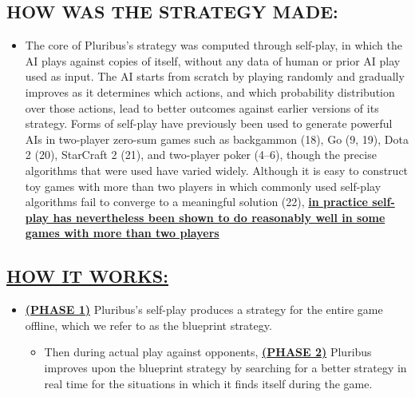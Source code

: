 \documentclass[
]{article}
\begin{document}
\subsection{HOW WAS THE STRATEGY MADE:}\label{how-was-the-strategy-made}

\begin{itemize}
\item
  The core of Pluribus's strategy was computed through self-play, in
  which the AI plays against copies of itself, without any data of human
  or prior AI play used as input. The AI starts from scratch by playing
  randomly and gradually improves as it determines which actions, and
  which probability distribution over those actions, lead to better
  outcomes against earlier versions of its strategy. Forms of self-play
  have previously been used to generate powerful AIs in two-player
  zero-sum games such as backgammon (18), Go (9, 19), Dota 2 (20),
  StarCraft 2 (21), and two-player poker (4--6), though the precise
  algorithms that were used have varied widely. Although it is easy to
  construct toy games with more than two players in which commonly used
  self-play algorithms fail to converge to a meaningful solution (22),
  \textbf{\ul{in practice self-play has nevertheless been shown to do
  reasonably well in some games with more than two players}}
\end{itemize}

\subsection{\texorpdfstring{\textbf{\ul{HOW IT
WORKS:}}}{HOW IT WORKS:}}\label{how-it-works}

\begin{itemize}
\item
  \textbf{\ul{(PHASE 1)}} Pluribus's self-play produces a strategy for
  the entire game offline, which we refer to as the blueprint strategy.

  \begin{itemize}
  \item
    Then during actual play against opponents, \textbf{\ul{(PHASE 2)}}
    Pluribus improves upon the blueprint strategy by searching for a
    better strategy in real time for the situations in which it finds
    itself during the game.
  \end{itemize}
\end{itemize}
\end{document}
